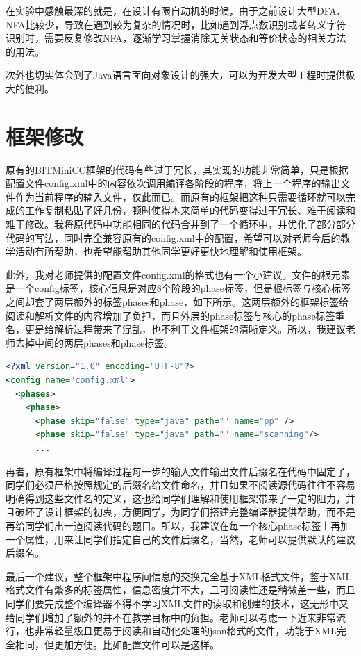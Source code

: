\documentclass[UTF8, twoside, titlepage]{ctexart}
\begin{document}
在实验中感触最深的就是，在设计有限自动机的时候，由于之前设计大型DFA、NFA比较少，导致在遇到较为复杂的情况时，比如遇到浮点数识别或者转义字符识别时，需要反复修改NFA，逐渐学习掌握消除无关状态和等价状态的相关方法的用法。

次外也切实体会到了Java语言面向对象设计的强大，可以为开发大型工程时提供极大的便利。

\section{框架修改}
原有的BITMiniCC框架的代码有些过于冗长，其实现的功能非常简单，只是根据配置文件config.xml中的内容依次调用编译各阶段的程序，将上一个程序的输出文件作为当前程序的输入文件，仅此而已。而原有的框架把这种只需要循环就可以完成的工作复制粘贴了好几份，顿时使得本来简单的代码变得过于冗长、难于阅读和难于修改。我将原代码中功能相同的代码合并到了一个循环中，并优化了部分部分代码的写法，同时完全兼容原有的config.xml中的配置，希望可以对老师今后的教学活动有所帮助，也希望能帮助其他同学更好更快地理解和使用框架。

此外，我对老师提供的配置文件config.xml的格式也有一个小建议。文件的根元素是一个config标签，核心信息是对应8个阶段的phase标签，但是根标签与核心标签之间却套了两层额外的标签phases和phase，如下所示。这两层额外的框架标签给阅读和解析文件的内容增加了负担，而且外层的phase标签与核心的phase标签重名，更是给解析过程带来了混乱，也不利于文件框架的清晰定义。所以，我建议老师去掉中间的两层phases和phase标签。

\begin{lstlisting}[language=XML]
<?xml version="1.0" encoding="UTF-8"?>
<config name="config.xml">
  <phases>
    <phase>
      <phase skip="false" type="java" path="" name="pp" />
      <phase skip="false" type="java" path="" name="scanning"/>
      ...
\end{lstlisting}

再者，原有框架中将编译过程每一步的输入文件输出文件后缀名在代码中固定了，同学们必须严格按照规定的后缀名给文件命名，并且如果不阅读源代码往往不容易明确得到这些文件名的定义，这也给同学们理解和使用框架带来了一定的阻力，并且破坏了设计框架的初衷，方便同学，为同学们搭建完整编译器提供帮助，而不是再给同学们出一道阅读代码的题目。所以，我建议在每一个核心phase标签上再加一个属性，用来让同学们指定自己的文件后缀名，当然，老师可以提供默认的建议后缀名。

最后一个建议，整个框架中程序间信息的交换完全基于XML格式文件，鉴于XML格式文件有繁多的标签属性，信息密度并不大，且可阅读性还是稍微差一些，而且同学们要完成整个编译器不得不学习XML文件的读取和创建的技术，这无形中又给同学们增加了额外的并不在教学目标中的负担。老师可以考虑一下近来非常流行，也非常轻量级且更易于阅读和自动化处理的json格式的文件，功能于XML完全相同，但更加方便。比如配置文件可以是这样。
\end{document}
